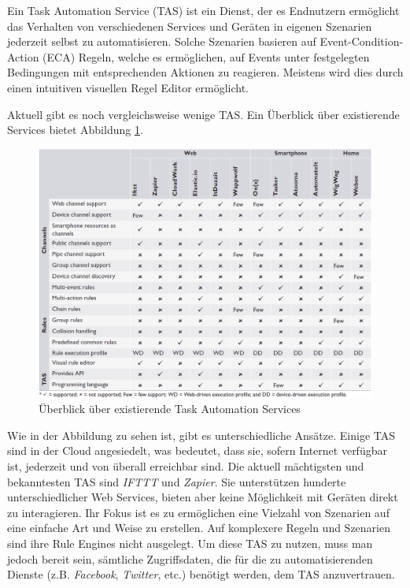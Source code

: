 \documentclass[12pt]{article}
\begin{document}
Ein Task Automation Service (TAS) ist ein Dienst, der es Endnutzern ermöglicht das Verhalten von verschiedenen Services und Geräten in eigenen Szenarien jederzeit selbst zu automatisieren. Solche Szenarien basieren auf Event-Condition-Action (ECA) Regeln, welche es ermöglichen, auf Events unter festgelegten Bedingungen mit entsprechenden Aktionen zu reagieren. Meistens wird dies durch  einen intuitiven visuellen Regel Editor ermöglicht.


Aktuell gibt es noch vergleichsweise wenige TAS. Ein Überblick über existierende  Services bietet Abbildung \ref{fig:tasoverview}.

\begin{figure}[h]
	\centering
	\includegraphics[width=\textwidth]{TASOverview}
	\caption{Überblick über existierende Task Automation Services \cite{ieee:tas}}
	\label{fig:tasoverview}
\end{figure}

Wie in der Abbildung zu sehen ist, gibt es unterschiedliche Ansätze. Einige TAS sind in der Cloud angesiedelt, was bedeutet, dass sie, sofern Internet verfügbar ist, jederzeit und von überall erreichbar sind. Die aktuell mächtigsten und bekanntesten TAS sind \textit{IFTTT} \cite{IFTTT} und \textit{Zapier}\cite{Zapier}. Sie unterstützen hunderte unterschiedlicher Web Services, bieten aber keine Möglichkeit mit Geräten direkt zu interagieren. Ihr Fokus ist es zu ermöglichen eine Vielzahl von Szenarien auf eine einfache Art und Weise zu erstellen. Auf komplexere Regeln und Szenarien sind ihre Rule Engines nicht ausgelegt. 
Um diese TAS zu nutzen, muss man jedoch bereit sein, sämtliche Zugriffsdaten, die für die zu automatisierenden Dienste (z.B. \textit{Facebook}, \textit{Twitter}, etc.) benötigt werden, dem TAS anzuvertrauen.
\end{document}
